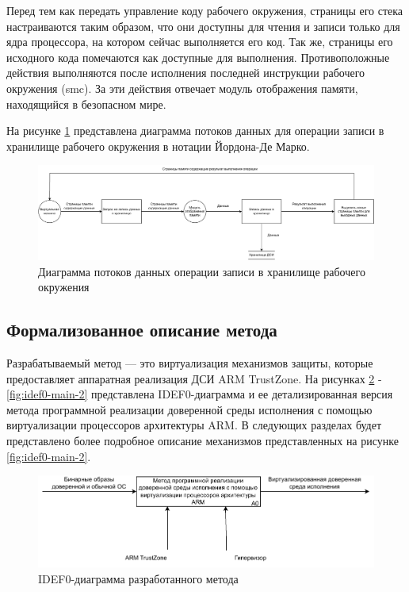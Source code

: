 Перед тем как передать управление коду рабочего окружения, страницы его стека настраиваются таким образом, что они доступны для чтения и записи только для ядра процессора, на котором сейчас выполняется его код. Так же, страницы его исходного кода помечаются как доступные для выполнения. Противоположные действия выполняются после исполнения последней инструкции рабочего окружения (smc). За эти действия отвечает модуль отображения памяти, находящийся в безопасном мире.

На рисунке \ref{fig:ciee} представлена диаграмма потоков данных для операции записи в хранилище рабочего окружения в нотации Йордона-Де Марко.

\begin{figure}[h]
	\centering
	\includegraphics[width=\textwidth]{img/dfd-ciee.pdf}
	\caption{Диаграмма потоков данных операции записи в хранилище рабочего окружения}
	\label{fig:ciee}
\end{figure}

\subsection{Формализованное описание метода}

Разрабатываемый метод --- это виртуализация механизмов защиты, которые предоставляет аппаратная реализация ДСИ ARM TrustZone. На рисунках \ref{fig:idef0-main-1} - \ref{fig:idef0-main-2} представлена IDEF0-диаграмма и ее детализированная версия метода программной реализации доверенной среды исполнения с помощью виртуализации процессоров архитектуры ARM. В следующих разделах будет представлено более подробное описание механизмов представленных на рисунке \ref{fig:idef0-main-2}.

\begin{figure}[h]
	\centering
	\includegraphics[width=\textwidth]{img/main-idef0-1.pdf}
	\caption{IDEF0-диаграмма разработанного метода}
	\label{fig:idef0-main-1}
\end{figure}

